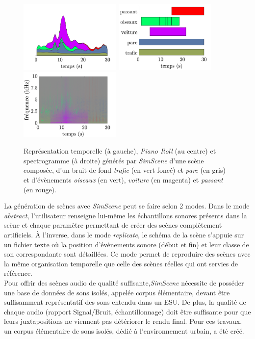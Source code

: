 \begin{figure}[ht]
\includegraphics[width=5cm]{./figures/SimScene/exemple-timeDomain.pdf}\hfill
\includegraphics[width=5cm]{./figures/SimScene/exemple-pianoRoll.pdf}\hfill
\includegraphics[width=5cm]{./figures/SimScene/exemple-spectrum.pdf}
\caption{Représentation temporelle (à gauche), \textit{Piano Roll} (au centre) et spectrogramme (à droite) générés par \textit{SimScene} d'une scène composée, d'un bruit de fond \textit{trafic} (en vert foncé) et \textit{parc} (en gris) et d'évènements \textit{oiseaux} (en vert), \textit{voiture} (en magenta) et \textit{passant} (en rouge).}\label{fig:somefiglabel}
\end{figure}

La génération de scènes avec \textit{SimScene} peut se faire selon 2 modes. Dans le mode \textit{abstract}, l'utilisateur renseigne lui-même les échantillons sonores présents dans la scène et chaque paramètre permettant de créer des scènes complètement artificiels. \`A l'inverse, dans le mode \textit{replicate}, le schéma de la scène s'appuie sur un fichier texte où la position d'évènements sonore (début et fin) et leur classe de son correspondante sont détaillées. Ce mode permet de reproduire des scènes avec la même organisation temporelle que celle des scènes réelles qui ont servies de référence.\\

Pour offrir des scènes audio de qualité suffisante,\textit{SimScene} nécessite de posséder une base de données de sons isolés, appelée corpus élémentaire, devant être suffisamment représentatif des sons entendu dans un ESU. De plus, la qualité de chaque audio (rapport Signal/Bruit, échantillonnage) doit être suffisante pour que leurs juxtapositions ne viennent pas détériorer le rendu final. Pour ces travaux, un corpus élémentaire de sons isolés, dédié à l'environnement urbain, a été créé.


